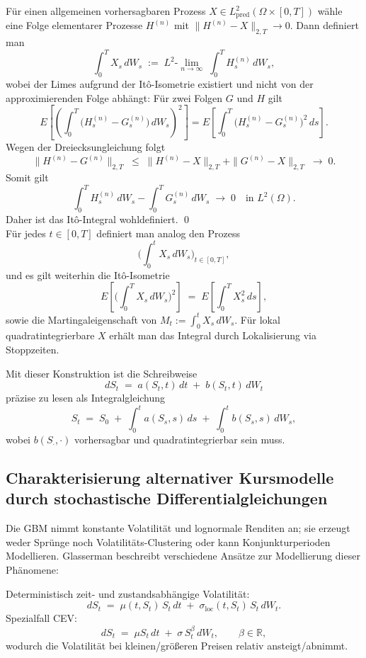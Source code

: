 \begin{defi}[It\^o-Integral]
Für einen allgemeinen vorhersagbaren Prozess $X\in L^2_{\mathrm{pred}}(\Omega\times[0,T])$ wähle eine Folge elementarer Prozesse $H^{(n)}$ mit
$\|H^{(n)}-X\|_{2,T}\to 0$. Dann definiert man
$$
\int_0^T X_s\,dW_s \;:=\; L^2\text{-}\lim_{n\to\infty}\;\int_0^T H^{(n)}_s\,dW_s,
$$
wobei der Limes aufgrund der It\^o-Isometrie existiert und nicht von der approximierenden Folge abhängt:
Für zwei Folgen $G$ und $H$ gilt
$$
E\!\left[
   \left( \int_0^T \big(H^{(n)}_s - G^{(n)}_s\big)\,dW_s \right)^2
\right]
= 
E \left [ \int_0^T \big(H^{(n)}_s - G^{(n)}_s\big)^2\,ds \right ].
$$
Wegen der Dreiecksungleichung folgt
$$
\|H^{(n)} - G^{(n)}\|_{2,T} 
\;\le\; 
\|H^{(n)} - X\|_{2,T} + \|G^{(n)} - X\|_{2,T}
\;\to\; 0.
$$
Somit gilt
$$
\int_0^T H^{(n)}_s\,dW_s - \int_0^T G^{(n)}_s\,dW_s 
\;\to\; 0 \quad \text{in } L^2(\Omega).
$$
Daher ist das It\^o-Integral wohldefiniert. \qed \\
Für jedes $t\in[0,T]$ definiert man analog den Prozess
$$
\Big(\int_0^t X_s\,dW_s\Big)_{t\in[0,T]},
$$
und es gilt weiterhin die It\^o-Isometrie
$$
E\!\left[\Big(\int_0^T X_s\,dW_s\Big)^{\!2}\right] \;=\; E\!\left[\int_0^T X_s^{2}\,ds\right],
$$
sowie die Martingaleigenschaft von $M_t:=\int_0^t X_s\,dW_s$. Für lokal quadratintegrierbare $X$ erhält man das Integral durch Lokalisierung via Stoppzeiten.
\end{defi}

\begin{bem}
Mit dieser Konstruktion ist die Schreibweise
$$
dS_t \;=\; a(S_t,t)\,dt \;+\; b(S_t,t)\,dW_t
$$
präzise zu lesen als Integralgleichung
$$
S_t \;=\; S_0 \;+\; \int_0^t a(S_s,s)\,ds \;+\; \int_0^t b(S_s,s)\,dW_s,
$$
wobei $b(S_\cdot,\cdot)$ vorhersagbar und quadratintegrierbar sein muss.
\end{bem}

\subsection{Charakterisierung alternativer Kursmodelle durch stochastische Differentialgleichungen}

Die GBM nimmt konstante Volatilität und lognormale Renditen an; sie erzeugt weder Sprünge noch Volatilitäts-Clustering oder kann Konjunkturperioden Modellieren.
Glasserman \cite{glasserman2003monte} beschreibt verschiedene Ansätze zur Modellierung dieser Phänomene:

\begin{bsp}
Deterministisch zeit- und zustandsabhängige Volatilität:
$$
dS_t \;=\; \mu(t,S_t)\,S_t\,dt \;+\; \sigma_{\mathrm{loc}}(t,S_t)\,S_t\,dW_t.
$$
Spezialfall CEV:
$$
dS_t \;=\; \mu S_t\,dt \;+\; \sigma\,S_t^{\beta}\,dW_t,\qquad \beta\in\mathbb R,
$$
wodurch die Volatilität bei kleinen/größeren Preisen relativ ansteigt/abnimmt.
\end{bsp}

